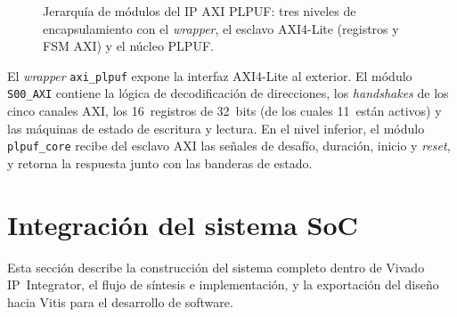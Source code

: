 \begin{figure}[htbp]
{%
  }
  \caption{Jerarquía de módulos del IP AXI PLPUF: tres niveles de
    encapsulamiento con el \textit{wrapper}, el esclavo AXI4-Lite
    (registros y FSM AXI) y el núcleo PLPUF.}
  \label{fig:plpuf_hierarchy}
\end{figure}

El \textit{wrapper} \texttt{axi\_plpuf} expone la interfaz AXI4-Lite al
exterior. El módulo \texttt{S00\_AXI} contiene la lógica de decodificación
de direcciones, los \textit{handshakes} de los cinco canales AXI, los
16~registros de 32~bits (de los cuales 11~están activos) y las máquinas de
estado de escritura y lectura. En el nivel inferior, el módulo
\texttt{plpuf\_core} recibe del esclavo AXI las señales de desafío, duración,
inicio y \textit{reset}, y retorna la respuesta junto con las banderas de
estado.

\section{Integración del sistema SoC}
\label{sec:integracion}

Esta sección describe la construcción del sistema completo dentro de Vivado
IP~Integrator, el flujo de síntesis e implementación, y la exportación del
diseño hacia Vitis para el desarrollo de software.

